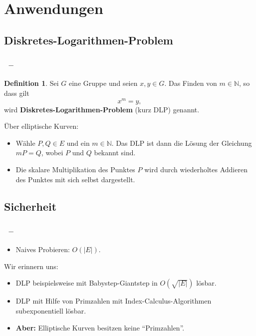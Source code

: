 \documentclass{beamer}
\theoremstyle{plain}
\theoremstyle{definition}
\newtheorem{defn}[thm]{Definition}
\theoremstyle{rem}
\begin{document}
\section{Anwendungen} 
\subsection{Diskretes-Logarithmen-Problem}

\begin{frame}
\frametitle{\insertsection~--~\insertsubsection}
\begin{defn} \label{DLP}
    Sei $G$ eine Gruppe und seien $x,y \in G$. Das Finden von $m \in \mathbb{N}$, so dass gilt
    \begin{equation*}
        x^m = y,
    \end{equation*}
    wird \textbf{Diskretes-Logarithmen-Problem} (kurz DLP) genannt.
\end{defn}
\pause
Über elliptische Kurven:
\begin{itemize}[<+->]
	\item Wähle $P,Q \in E$ und ein $m \in \mathbb{N}$. Das DLP ist dann die Lösung der Gleichung $mP = Q$, wobei $P$ und $Q$ bekannt sind. 
	\item Die skalare Multiplikation des Punktes $P$ wird durch wiederholtes Addieren des Punktes mit sich selbst dargestellt. 
\end{itemize}

\end{frame}

\subsection{Sicherheit}

\begin{frame}
\frametitle{\insertsection~--~\insertsubsection}
\begin{itemize}
	\item Naives Probieren: $O(|E|)$. 
\end{itemize}
\pause
Wir erinnern uns:
\begin{itemize}[<+->]
	\item DLP beispielsweise mit Babystep-Giantstep in $O(\sqrt{|E|})$ lösbar.
	\item DLP mit Hilfe von Primzahlen mit Index-Calculus-Algorithmen subexponentiell lösbar.
	\item[] \textbf{Aber:} Elliptische Kurven besitzen keine ``Primzahlen''.
\end{itemize}
\end{frame}
\end{document}
